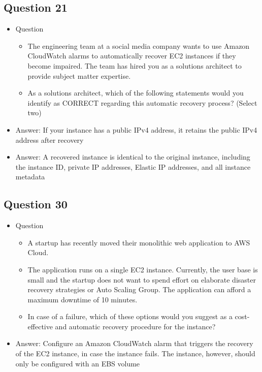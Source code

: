 \documentclass[]{scrartcl}
\begin{document}
\subsection{Question 21}
\begin{itemize}
	\item Question
	\begin{itemize}
		\item The engineering team at a social media company wants to use Amazon CloudWatch alarms to automatically recover EC2 instances if they become impaired. The team has hired you as a solutions architect to provide subject matter expertise.
		\item As a solutions architect, which of the following statements would you identify as CORRECT regarding this automatic recovery process? (Select two)
	\end{itemize}
	\item Answer: If your instance has a public IPv4 address, it retains the public IPv4 address after recovery
	\item Answer: A recovered instance is identical to the original instance, including the instance ID, private IP addresses, Elastic IP addresses, and all instance metadata
\end{itemize}

\subsection{Question 30}
\begin{itemize}
	\item Question
	\begin{itemize}
		\item A startup has recently moved their monolithic web application to AWS Cloud. 
		\item The application runs on a single EC2 instance. Currently, the user base is small and the startup does not want to spend effort on elaborate disaster recovery strategies or Auto Scaling Group. The application can afford a maximum downtime of 10 minutes.
		\item In case of a failure, which of these options would you suggest as a cost-effective and automatic recovery procedure for the instance?
	\end{itemize}
	\item Answer: Configure an Amazon CloudWatch alarm that triggers the recovery of the EC2 instance, in case the instance fails. The instance, however, should only be configured with an EBS volume
\end{itemize}
\end{document}
